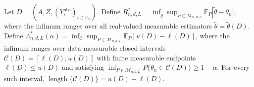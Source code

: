 Let \(D=(A,Z,(Y_i^{\mathrm{obs}})_{i\in\mathcal V_n})\). Define \(R^*_{n,d,L}=\inf_{\widetilde\theta}\sup_{P\in\mathcal M_{n,d,L}}\mathbb E_P|\widetilde\theta-\theta_n|\), where the infimum ranges over all real-valued measurable estimators \(\widetilde\theta=\widetilde\theta(D)\). Define \(\Lambda^*_{n,d,L}(\alpha)=\inf_{\mathcal C}\sup_{P\in\mathcal M_{n,d,L}}\mathbb E_P[u(D)-\ell(D)]\), where the infimum ranges over data-measurable closed intervals \(\mathcal C(D)=[\ell(D),u(D)]\) with finite measurable endpoints \(\ell(D)\leq u(D)\) and satisfying \(\inf_{P\in\mathcal M_{n,d,L}}P\{\theta_n\in\mathcal C(D)\}\geq1-\alpha\). For every such interval, \(\operatorname{length}\{\mathcal C(D)\}=u(D)-\ell(D)\).